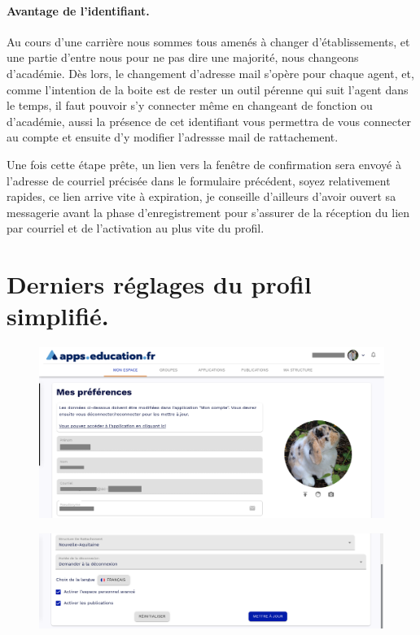 \paragraph{Avantage de l'identifiant.} Au cours d'une carrière nous sommes tous amenés à changer d'établissements, et une partie d'entre nous pour ne pas dire une majorité, nous changeons d'académie. 
Dès lors, le changement d'adresse mail s'opère pour chaque agent, et, comme l'intention de la boite est de rester un outil pérenne qui suit l'agent dans le temps, il faut pouvoir s'y connecter même en changeant de fonction ou d'académie, aussi la présence de cet identifiant vous permettra de vous connecter au compte et ensuite d'y modifier l'adressse mail de rattachement.

Une fois cette étape prête, un lien vers la fenêtre de confirmation sera envoyé à l'adresse de courriel précisée dans le formulaire précédent, soyez relativement rapides, ce lien arrive vite à expiration, je conseille d'ailleurs d'avoir ouvert sa messagerie avant la phase d'enregistrement pour s'assurer de la réception du lien par courriel et de l'activation au plus vite du profil.

\section{Derniers réglages du profil simplifié.}

\begin{figure}
	\centering
	\includegraphics{./Captures/portail.profil.haut.png}
	\caption{}
\end{figure}

\begin{figure}
	\centering
	\includegraphics{./Captures/portail.profil.milieu.png}
	\caption{}
\end{figure}

